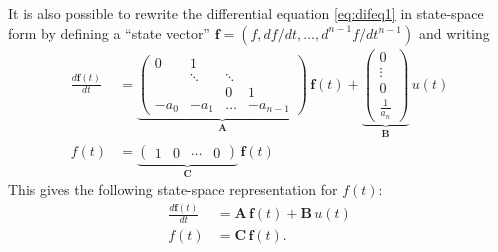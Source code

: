 \documentclass[journal]{IEEEtran}
\begin{document}
It is also possible to rewrite the differential equation \eqref{eq:difeq1} in state-space form by defining a ``state vector'' $\mathbf{f} = (f, df/dt,\ldots,d^{n-1}f/dt^{n-1})$ and writing
%
\begin{equation}
\begin{split}
  \frac{d\mathbf{f}(t)}{dt}
  &= \underbrace{\begin{pmatrix}
       0             & 1      &        &       \\
                     & \ddots & \ddots &       \\
                     &         &  0    &     1 \\
   -a_0 & -a_1 & \hdots &  -a_{n-1}
  \end{pmatrix}}_{\mathbf{A}} \, \mathbf{f}(t)
  + \underbrace{\begin{pmatrix}
      0 \\
      \vdots \\
      0 \\
      \frac{1}{a_n}
  \end{pmatrix}}_{\mathbf{B}} \,
   u(t) \\
   f(t) &= \underbrace{\begin{pmatrix}
     1 & 0 & \cdots & 0
   \end{pmatrix}}_{\mathbf{C}} \, \mathbf{f}(t)
\end{split}
\label{eq:ss1}
\end{equation}
%
This gives the following state-space representation for $f(t)$:
%
\begin{equation}
\begin{split}
  \frac{d\mathbf{f}(t)}{dt}
  &= \mathbf{A} \, \mathbf{f}(t) + \mathbf{B} \, u(t) \\
  f(t) &= \mathbf{C} \, \mathbf{f}(t).
\end{split}
\label{eq:ssgen}
\end{equation}
%
\end{document}
